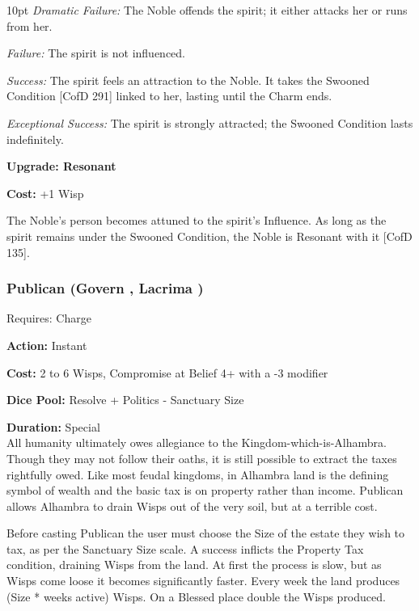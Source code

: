 \begin{myindentpar}{10pt} \emph{Dramatic Failure:} The Noble offends the spirit; it either attacks her or runs from her.

\emph{Failure:} The spirit is not influenced.

\emph{Success:} The spirit feels an attraction to the Noble. It takes the Swooned Condition [CofD 291] linked to her, lasting until the Charm ends.

\emph{Exceptional Success:}	 The spirit is strongly attracted; the Swooned Condition lasts indefinitely.

\textbf{Upgrade: Resonant}

\textbf{Cost:} +1 Wisp

The Noble’s person becomes attuned to the spirit’s Influence. As long as the spirit remains under the Swooned Condition, the Noble is Resonant with it [CofD 135].

\end{myindentpar}

\subsubsection*{Publican (Govern \textbullet\textbullet\textbullet, Lacrima \textbullet\textbullet)}

\noindent Requires: Charge

\noindent \textbf{Action:} Instant

\noindent \textbf{Cost:} 2 to 6 Wisps, Compromise at Belief 4+ with a -3 modifier

\noindent \textbf{Dice Pool:} Resolve + Politics - Sanctuary Size

\noindent \textbf{Duration:} Special \\

\noindent All humanity ultimately owes allegiance to the Kingdom-which-is-Alhambra. Though they may not follow their oaths, it is still possible to extract the taxes rightfully owed. Like most feudal kingdoms, in Alhambra land is the defining symbol of wealth and the basic tax is on property rather than income. Publican allows Alhambra to drain Wisps out of the very soil, but at a terrible cost. 

Before casting Publican the user must choose the Size of the estate they wish to tax, as per the Sanctuary Size scale. A success inflicts the Property Tax condition, draining Wisps from the land. At first the process is slow, but as Wisps come loose it becomes significantly faster. Every week the land produces (Size * weeks active) Wisps. On a Blessed place double the Wisps produced.

